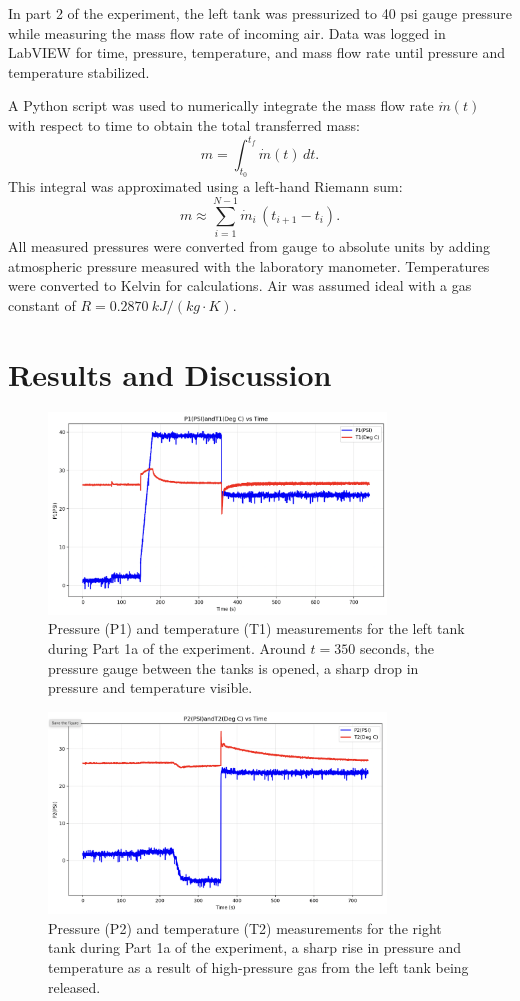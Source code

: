 \documentclass[12pt]{article}
\begin{document}
In part 2 of the experiment, the left tank was pressurized to 40 psi gauge pressure while measuring the mass flow rate of incoming air. 
Data was logged in LabVIEW for time, pressure, temperature, and mass flow rate until pressure and temperature stabilized.

A Python script was used to numerically integrate the mass flow rate \(\dot m(t)\) with respect to time to obtain the total transferred mass:
\[
m = \int_{t_0}^{t_f} \dot m(t)\,dt.
\]
This integral was approximated using a left-hand Riemann sum:
\[
m \approx \sum_{i=1}^{N-1} \dot m_i \,(t_{i+1}-t_i).
\]
All measured pressures were converted from gauge to absolute units by adding atmospheric pressure measured with the laboratory manometer. Temperatures were converted to Kelvin for calculations. Air was assumed ideal with a gas constant of \(R = 0.2870~\si{kJ/(kg\cdot K)}\).

\section*{Results and Discussion}

\begin{figure}[h!]
\centering
\includegraphics[width=0.8\textwidth]{1a-left_tank.png}
\caption{Pressure (P1) and temperature (T1) measurements for the left tank during Part 1a of the experiment. Around $t = 350$ seconds, the pressure gauge between the tanks is opened, a sharp drop in pressure and temperature visible.}
\label{fig:tank1_data_a}
\end{figure}

\begin{figure}[h!]
\centering
\includegraphics[width=0.8\textwidth]{1a-right_tank.png}
\caption{Pressure (P2) and temperature (T2) measurements for the right tank during Part 1a of the experiment, a sharp rise in pressure and temperature as a result of high-pressure gas from the left tank being released.}
\label{fig:tank2_data_a}
\end{figure}
\end{document}
